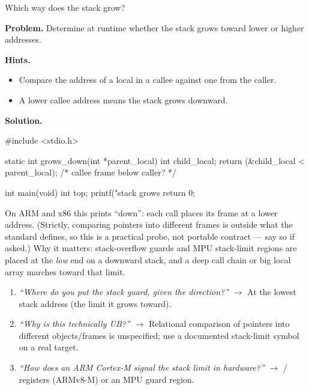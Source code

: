 \begin{gymproblem}{Which way does the stack grow?}

\textbf{Problem.} Determine at runtime whether the stack grows toward lower or
higher addresses.

\textbf{Hints.}
\begin{itemize}
\item Compare the address of a local in a callee against one from the caller.
\item A lower callee address means the stack grows downward.
\end{itemize}

\attempt

\textbf{Solution.}
\begin{cgym}
#include <stdio.h>

static int grows_down(int *parent_local) {
    int child_local;
    return (&child_local < parent_local);  /* callee frame below caller? */
}

int main(void) {
    int top;
    printf("stack grows %
    return 0;
}
\end{cgym}

On ARM and x86 this prints ``down'': each call places its frame at a lower
address. (Strictly, comparing pointers into different frames is outside what
the standard defines, so this is a practical probe, not portable contract ---
say so if asked.) Why it matters: stack-overflow guards and MPU stack-limit
regions are placed at the \emph{low} end on a downward stack, and a deep call
chain or big local array marches toward that limit.

\followups
\begin{enumerate}
\item \emph{``Where do you put the stack guard, given the direction?''}
  $\rightarrow$ At the lowest stack address (the limit it grows toward).
\item \emph{``Why is this technically UB?''} $\rightarrow$ Relational
  comparison of pointers into different objects/frames is unspecified; use a
  documented stack-limit symbol on a real target.
\item \emph{``How does an ARM Cortex-M signal the stack limit in hardware?''}
  $\rightarrow$ / registers (ARMv8-M) or an MPU
  guard region.
\end{enumerate}
\end{gymproblem}


